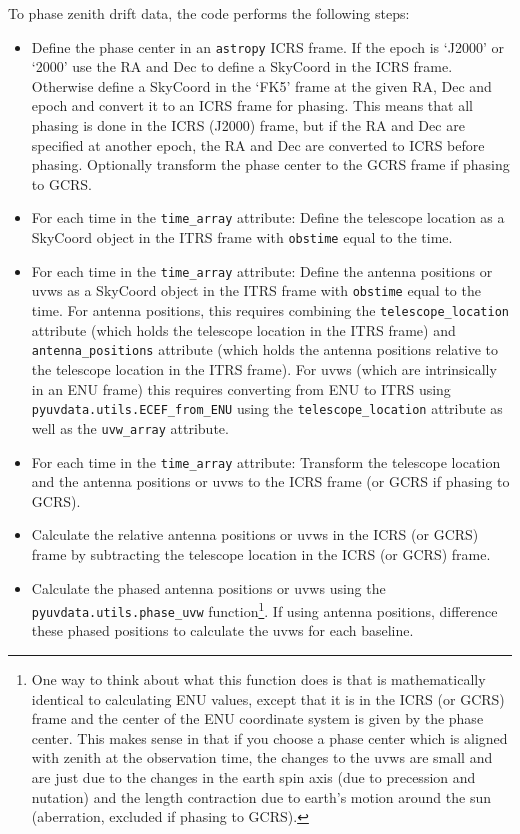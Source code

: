 \documentclass[11pt, oneside]{article}   	%
\begin{document}
To phase zenith drift data, the code performs the following steps:
\begin{itemize}
\item{Define the phase center in an \texttt{astropy} ICRS frame. If the epoch is `J2000' or `2000' use the RA and Dec to define a SkyCoord in the ICRS frame. Otherwise define a SkyCoord in the `FK5' frame at the given RA, Dec and epoch and convert it to an ICRS frame for phasing. This means that all phasing is done in the ICRS (J2000) frame, but if the RA and Dec are specified at another epoch, the RA and Dec are converted to ICRS before phasing. Optionally transform the phase center to the GCRS frame if phasing to GCRS.}
\item{For each time in the \verb!time_array! attribute: Define the telescope location as a SkyCoord object in the ITRS frame with \verb!obstime! equal to the time.}
\item{For each time in the \verb!time_array! attribute: Define the antenna positions or uvws as a SkyCoord object in the ITRS frame with \verb!obstime! equal to the time. For antenna positions, this requires combining the \verb!telescope_location! attribute (which holds the telescope location in the ITRS frame) and \verb!antenna_positions! attribute (which holds the antenna positions relative to the telescope location in the ITRS frame). For uvws (which are intrinsically in an ENU frame) this requires converting from ENU to ITRS using \verb! pyuvdata.utils.ECEF_from_ENU! using the \verb!telescope_location! attribute as well as the \verb!uvw_array! attribute.}
\item{For each time in the \verb!time_array! attribute: Transform the telescope location and the antenna positions or uvws to the ICRS frame (or GCRS if phasing to GCRS).}
\item{Calculate the relative antenna positions or uvws in the ICRS (or GCRS) frame by subtracting the telescope location in the ICRS (or GCRS) frame.}
\item{Calculate the phased antenna positions or uvws using the \verb!pyuvdata.utils.phase_uvw! function\footnote{One way to think about what this function does is that is mathematically identical to calculating ENU values, except that it is in the ICRS (or GCRS) frame and the center of the ENU coordinate system is given by the phase center. This makes sense in that if you choose a phase center which is aligned with zenith at the observation time, the changes to the uvws are small and are just due to the changes in the earth spin axis (due to precession and nutation) and the length contraction due to earth's motion around the sun (aberration, excluded if phasing to GCRS).}. If using antenna positions, difference these phased positions to calculate the uvws for each baseline.}
\end{itemize}
\end{document}

